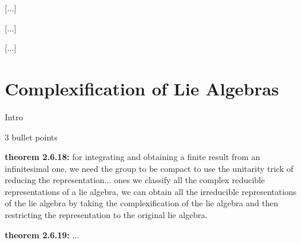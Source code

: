 [...]


[...]


[...]





\section{Complexification of Lie Algebras}

Intro

3 bullet points

\textbf{theorem 2.6.18:} for integrating and obtaining a finite result from an infinitesimal one, we need the group to be compact to use the unitarity trick of reducing the representation...
ones we classify all the complex reducible representations of a lie algebra, we can obtain all the irreducible representations of the lie algebra by taking the complexification of the lie algebra and then restricting the representation to the original lie algebra.

\textbf{theorem 2.6.19:} ...

